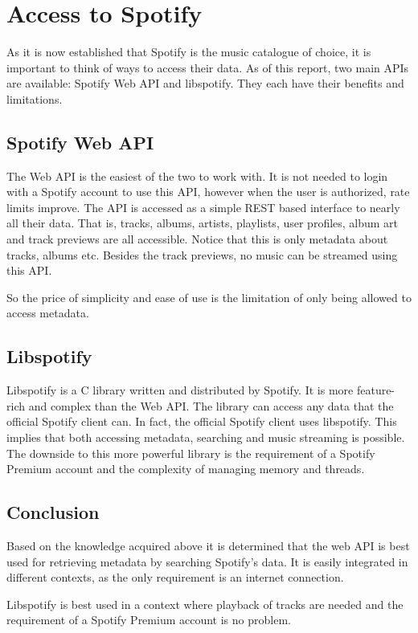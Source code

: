 \section{Access to Spotify}
\label{sub:Access_to_Spotify}

As it is now established that Spotify is the music catalogue of choice, it is important to think of ways to access their data. As of this report, two main APIs are available: Spotify Web API and libspotify. They each have their benefits and limitations.

\subsection{Spotify Web API}
\label{techPlat:music_catalog_web_api}

The Web API is the easiest of the two to work with. It is not needed to login with a Spotify account to use this API, however when the user is authorized, rate limits improve. The API is accessed as a simple REST based interface to nearly all their data. That is, tracks, albums, artists, playlists, user profiles, album art and track previews are all accessible. Notice that this is only metadata about tracks, albums etc. Besides the track previews, no music can be streamed using this API.

So the price of simplicity and ease of use is the limitation of only being allowed to access metadata.

\subsection{Libspotify}
\label{techPlat:music_catalog_libspotify}

Libspotify is a C library written and distributed by Spotify. It is more feature-rich and complex than the Web API. The library can access any data that the official Spotify client can. In fact, the official Spotify client uses libspotify. This implies that both accessing metadata, searching and music streaming is possible. The downside to this more powerful library is the requirement of a Spotify Premium account and the complexity of managing memory and threads.

\subsection{Conclusion}
\label{ssub:music_catalog_conclusion}

Based on the knowledge acquired above it is determined that the web API is best used for retrieving metadata by searching Spotify's data. It is easily integrated in different contexts, as the only requirement is an internet connection.

Libspotify is best used in a context where playback of tracks are needed and the requirement of a Spotify Premium account is no problem.
